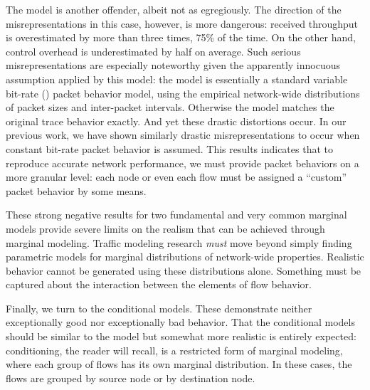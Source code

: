\documentclass[twocolumn,final]{svjour3}
\begin{document}
The  model is another offender, albeit not as egregiously. The direction of the misrepresentations in this case, however, is more dangerous: received throughput is overestimated by more than three times, 75\% of the time. On the other hand,  control overhead is underestimated by half on average. Such serious misrepresentations are especially noteworthy given the apparently innocuous assumption applied by this model: the  model is essentially a standard variable bit-rate () packet behavior model, using the empirical network-wide distributions of packet sizes and inter-packet intervals. Otherwise the model matches the original trace behavior exactly. And yet these drastic distortions occur. In our previous work, we have shown similarly drastic misrepresentations to occur when constant bit-rate packet behavior is assumed. This results indicates that to reproduce accurate network performance, we must provide packet behaviors on a more granular level: each node or even each flow must be assigned a ``custom'' packet behavior by some means.

These strong negative results for two fundamental and very common marginal models provide severe limits on the realism that can be achieved through marginal modeling. Traffic modeling research \textit{must} move beyond simply finding parametric models for marginal distributions of network-wide properties. Realistic behavior cannot be generated using these distributions alone. Something must be captured about the interaction between the elements of flow behavior.

Finally, we turn to the conditional models. These demonstrate neither exceptionally good nor exceptionally bad behavior. That the conditional models should be similar to the  model but somewhat more realistic is entirely expected: conditioning, the reader will recall, is a restricted form of marginal modeling, where each group of flows has its own marginal distribution. In these cases, the flows are grouped by source node or by destination node.

\end{document}
